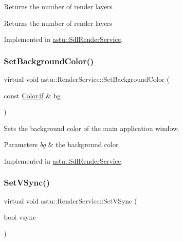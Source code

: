Returns the number of render layers.

\begin{DoxyReturn}{Returns}
the number of render layers 
\end{DoxyReturn}


Implemented in \hyperlink{classastu_1_1SdlRenderService_a45305851abdc94c0d9c8441822a59cd2}{astu\+::\+Sdl\+Render\+Service}.

\mbox{\label{classastu_1_1RenderService_acae1a271e76761320a95d5664ce5b134}} 
\subsubsection{\texorpdfstring{Set\+Background\+Color()}{SetBackgroundColor()}}
{\footnotesize\ttfamily virtual void astu\+::\+Render\+Service\+::\+Set\+Background\+Color (\begin{DoxyParamCaption}\item[{const \hyperlink{classastu_1_1Color}{Color4f} \&}]{bg }\end{DoxyParamCaption})\hspace{0.3cm}{\ttfamily [pure virtual]}}

Sets the background color of the main application window.


\begin{DoxyParams}{Parameters}
{\em bg} & the background color \\
\hline
\end{DoxyParams}


Implemented in \hyperlink{classastu_1_1SdlRenderService_a1b92671271fa91f44e7b3e6c57bebe54}{astu\+::\+Sdl\+Render\+Service}.

\mbox{\label{classastu_1_1RenderService_af13a90300b42075e26c998d19332eff6}} 
\subsubsection{\texorpdfstring{Set\+V\+Sync()}{SetVSync()}}
{\footnotesize\ttfamily virtual void astu\+::\+Render\+Service\+::\+Set\+V\+Sync (\begin{DoxyParamCaption}\item[{bool}]{vsync }\end{DoxyParamCaption})\hspace{0.3cm}{\ttfamily [pure virtual]}}

